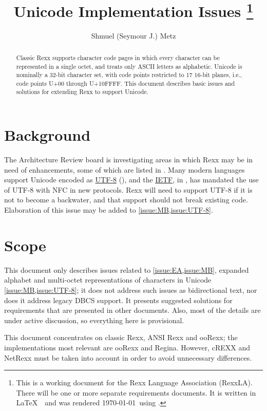 \documentclass[b4paper]{article}
\title{Unicode Implementation Issues%
  \thanks
    {
    This is a working document for the Rexx Language Association (RexxLA).
    There will be one or more separate requirements documents.
    It is written in \LaTeX\ \fmtversion\ and was rendered \today\ using \enginedetails.
    }
  }
\author{Shmuel (Seymour J.) Metz}
\begin{document}

\maketitle

\begin{abstract}
Classic Rexx supports character code pages in which every character can be represented in a single octet,
and treats only ASCII letters as alphabetic.
Unicode is nominally a 32-bit character set, with code points restricted to 17 16-bit planes,
i.e., code points U+00 through U+10FFFF.
This document describes basic issues and solutions for extending Rexx to support Unicode.
\end{abstract}

\tableofcontents


\section{Background}
The Architecture Review board is investigating areas in which Rexx may be
in need of enhancements, some of which are listed in \cite{Req}.
Many modern languages support Unicode encoded as
\href{https://datatracker.ietf.org/doc/rfc3629/}{UTF-8} (\cite{RFC 3629}),
and the \href{https://www.ietf.org/}{IETF}, in \cite{RFC 5198},
has mandated the use of UTF-8 with NFC in new protocols.
Rexx will need to support UTF-8 if it is not to become a backwater,
and that support should not break existing code.
Elaboration of this issue may be added to \cite{Req} \cref{issue:MB,issue:UTF-8}.


\section{Scope}
This document only describes issues related to \cref{issue:EA,issue:MB}, expanded alphabet and
multi-octet representations of characters in Unicode \cref{issue:MB,issue:UTF-8}; it does not
address such issues as bidirectional text, nor does it address legacy
DBCS support. It presents suggested solutions for requirements that
are presented in other documents.  Also, most of the details are under
active discussion, so everything here is provisional.

This document concentrates on classic Rexx, ANSI Rexx and ooRexx; the
implementations most relevant are ooRexx and Regina.  However, cREXX
and NetRexx must be taken into account in order to avoid unnecessary
differences.
\end{document}
